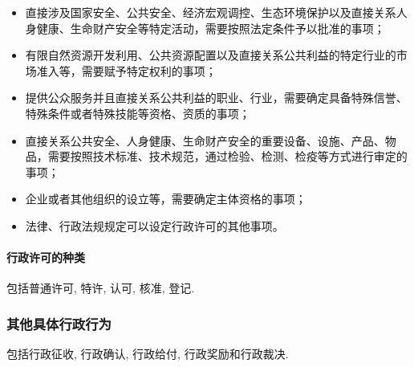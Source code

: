 \begin{itemize}
	\item 直接涉及国家安全、公共安全、经济宏观调控、生态环境保护以及直接关系人身健康、生命财产安全等特定活动，需要按照法定条件予以批准的事项；
	\item 有限自然资源开发利用、公共资源配置以及直接关系公共利益的特定行业的市场准入等，需要赋予特定权利的事项；
	\item 提供公众服务并且直接关系公共利益的职业、行业，需要确定具备特殊信誉、特殊条件或者特殊技能等资格、资质的事项；
	\item 直接关系公共安全、人身健康、生命财产安全的重要设备、设施、产品、物品，需要按照技术标准、技术规范，通过检验、检测、检疫等方式进行审定的事项；
	\item 企业或者其他组织的设立等，需要确定主体资格的事项；
	\item 法律、行政法规规定可以设定行政许可的其他事项。
\end{itemize}

\paragraph{行政许可的种类} 包括普通许可, 特许, 认可, 核准, 登记.

\subsubsection{其他具体行政行为} 包括行政征收, 行政确认, 行政给付, 行政奖励和行政裁决.